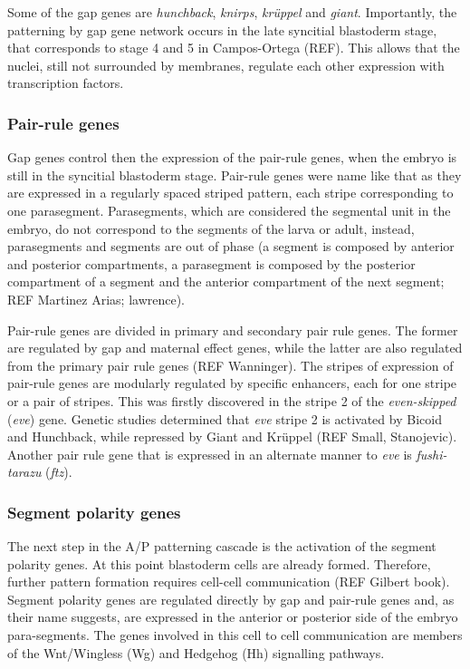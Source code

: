Some of the gap genes are \textit{hunchback}, \textit{knirps}, \textit{kr\"{u}ppel} and \textit{giant}.
Importantly, the patterning by gap gene network occurs in the late syncitial blastoderm stage, that corresponds to stage 4 and 5 in Campos-Ortega (REF).
This allows that the nuclei, still not surrounded by membranes, regulate each other expression with transcription factors.

\subsubsection{Pair-rule genes}

Gap genes control then the expression of the pair-rule genes, when the embryo is still in the syncitial blastoderm stage. 
Pair-rule genes were name like that as they are expressed in a regularly spaced striped pattern, each stripe corresponding to one parasegment.
Parasegments, which are considered the segmental unit in the embryo, do not correspond to the segments of the larva or adult, instead, parasegments and segments are out of phase (a segment is composed by anterior and posterior compartments, a parasegment is composed by the posterior compartment of a segment and the anterior compartment of the next segment;  REF Martinez Arias; lawrence).

Pair-rule genes are divided in primary and secondary pair rule genes. The former are regulated by gap and maternal effect genes, while the latter are also regulated from the primary pair
rule genes (REF Wanninger).
The stripes of expression of pair-rule genes are modularly regulated by specific enhancers, each for one stripe or a pair of stripes.
This was firstly discovered in the stripe 2 of the \textit{even-skipped} (\textit{eve}) gene. 
Genetic studies determined that \textit{eve} stripe 2 is activated by Bicoid and Hunchback, while repressed by Giant and Kr\"{u}ppel (REF Small, Stanojevic).
Another pair rule gene that is expressed in an alternate manner to \textit{eve} is \textit{fushi-tarazu} (\textit{ftz}).


\subsubsection{Segment polarity genes}

The next step in the A/P patterning cascade is the activation of the segment polarity genes.
At this point blastoderm cells are already formed. Therefore, further pattern formation requires cell-cell communication (REF Gilbert book).
Segment polarity genes are regulated directly by gap and pair-rule genes and, as their name suggests, are expressed in the anterior or posterior side of the embryo para-segments.
The genes involved in this cell to cell communication are members of the Wnt/Wingless (Wg) and Hedgehog (Hh) signalling pathways.

